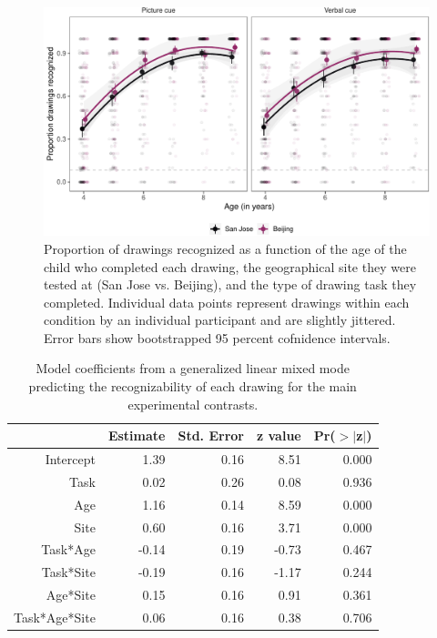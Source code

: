 \documentclass[
  english,
  man]{apa6}
\begin{document}
\begin{figure}[H]

{\centering \includegraphics[width=\textwidth]{figs/main-results-1} 

}

\caption{Proportion of drawings recognized as a function of the age of the child who completed each drawing, the geographical site they were tested at (San Jose vs. Beijing), and the type of drawing task they completed. Individual data points represent drawings within each condition by an individual participant and are slightly jittered. Error bars show bootstrapped 95 percent cofnidence intervals.}\label{fig:main-results}
\end{figure}

\begin{table}[ht]
\centering
\begin{tabular}{rrrrr}
  \hline
 & Estimate & Std. Error & z value & Pr($>$$|$z$|$) \\ 
  \hline
Intercept & 1.39 & 0.16 & 8.51 & 0.000 \\ 
  Task & 0.02 & 0.26 & 0.08 & 0.936 \\ 
  Age & 1.16 & 0.14 & 8.59 & 0.000 \\ 
  Site & 0.60 & 0.16 & 3.71 & 0.000 \\ 
  Task*Age & -0.14 & 0.19 & -0.73 & 0.467 \\ 
  Task*Site & -0.19 & 0.16 & -1.17 & 0.244 \\ 
  Age*Site & 0.15 & 0.16 & 0.91 & 0.361 \\ 
  Task*Age*Site & 0.06 & 0.16 & 0.38 & 0.706 \\ 
   \hline
\end{tabular}
\caption{Model coefficients from a generalized linear mixed mode predicting the recognizability of each drawing for the main experimental contrasts.} 
\end{table}
\end{document}
